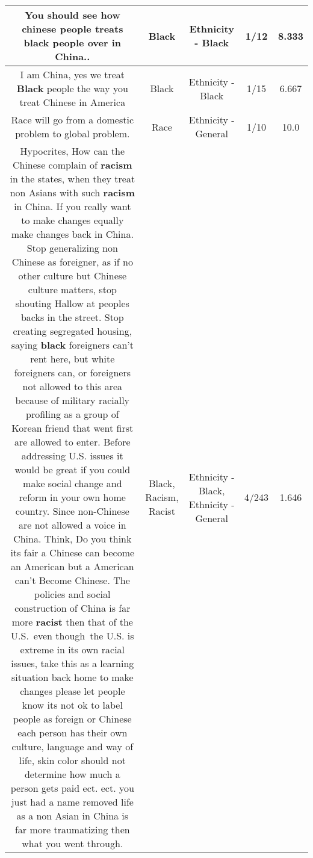 \documentclass[11pt]{article}
\newlength\mylength
\begin{document}
\begin{center}
\begin{longtable}{|C{.65\mylength}|C{.30\mylength}|C{.12\mylength}|C{.12\mylength}|C{.12\mylength}|}
  \small You should see how chinese people treats \textbf{black} people over in China..\normalsize   & Black & Ethnicity - Black & 1/12 & 8.333 \\  \hline
  \small I am China, yes we treat \textbf{Black} people the way you treat Chinese in America\normalsize   & Black & Ethnicity - Black & 1/15 & 6.667 \\  \hline
  \small Race will go from a domestic problem to global problem.\normalsize   & Race & Ethnicity - General & 1/10 & 10.0 \\  \hline
  \small Hypocrites, How can the Chinese complain of \textbf{racism} in the states, when they treat non Asians with such \textbf{racism} in China. If you really want to make changes equally make changes back in China. Stop generalizing non Chinese as foreigner, as if no other culture but Chinese culture matters, stop shouting Hallow at peoples backs in the street. Stop creating segregated housing, saying \textbf{black} foreigners can't rent here, but white foreigners can, or foreigners not allowed to this area because of military racially profiling as a group of Korean friend that went first are allowed to enter. Before addressing U.S. issues it would be great if you could make social change and reform in your own home country. Since non-Chinese are not allowed a voice in China. Think, Do you think its fair a Chinese can become an American but a American can't Become Chinese. The policies and social construction of China is far more \textbf{racist} then that of the U.S. even though the U.S. is extreme in its own racial issues, take this as a learning situation back home to make changes please let people know its not ok to label people as foreign or Chinese each person has their own culture, language and way of life, skin color should not determine how much a person gets paid ect. ect. you just had a name removed life as a non Asian in China is far more traumatizing then what you went through.\normalsize   & Black, Racism, Racist & Ethnicity - Black, Ethnicity - General & 4/243 & 1.646 \\  \hline

\end{longtable}
\end{center}
\end{document}

